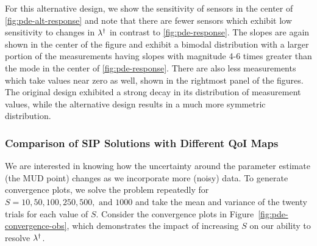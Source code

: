 For this alternative design, we show the sensitivity of sensors in the center of \ref{fig:pde-alt-response} and note that there are fewer sensors which exhibit low sensitivity to changes in $\lambda^\dagger$ in contrast to \ref{fig:pde-response}.
The slopes are again shown in the center of the figure and exhibit a bimodal distribution with a larger portion of the measurements having slopes with magnitude 4-6 times greater than the mode in the center of \ref{fig:pde-response}.
There are also less measurements which take values near zero as well, shown in the rightmost panel of the figures.
The original design exhibited a strong decay in its distribution of measurement values, while the alternative design results in a much more symmetric distribution.

\FloatBarrier
\subsubsection{Comparison of SIP Solutions with Different QoI Maps}

We are interested in knowing how the uncertainty around the parameter estimate (the MUD point) changes as we incorporate more (noisy) data.
To generate convergence plots, we solve the problem repeatedly for $S = 10, 50, 100, 250, 500, \text{ and } 1000$ and take the mean and variance of the twenty trials for each value of $S$.
Consider the convergence plots in Figure~\ref{fig:pde-convergence-obs}, which demonstrates the impact of increasing $S$ on our ability to resolve $\lambda^\dagger$.

